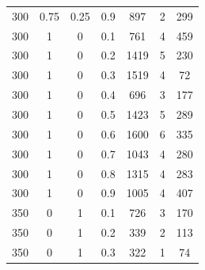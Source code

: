 \documentclass[a4paper,oneside,14pt]{extreport}
\begin{document}
\begin{table}[h]
\begin{center}
\begin{tabular}{|c|c|c|c|c|c|c|}
		300 & 0.75 & 0.25 & 0.9 & 897 & 2 & 299 \\
		300 & 1 & 0 & 0.1 & 761 & 4 & 459 \\
		300 & 1 & 0 & 0.2 & 1419 & 5 & 230 \\
		300 & 1 & 0 & 0.3 & 1519 & 4 & 72 \\
		300 & 1 & 0 & 0.4 & 696 & 3 & 177 \\
		300 & 1 & 0 & 0.5 & 1423 & 5 & 289 \\
		300 & 1 & 0 & 0.6 & 1600 & 6 & 335 \\
		300 & 1 & 0 & 0.7 & 1043 & 4 & 280 \\
		300 & 1 & 0 & 0.8 & 1315 & 4 & 283 \\
		300 & 1 & 0 & 0.9 & 1005 & 4 & 407 \\
		350 & 0 & 1 & 0.1 & 726 & 3 & 170 \\
		350 & 0 & 1 & 0.2 & 339 & 2 & 113 \\
		350 & 0 & 1 & 0.3 & 322 & 1 & 74 \\	
		\hline
	\end{tabular}
\end{center}
\end{table}
\end{document}
